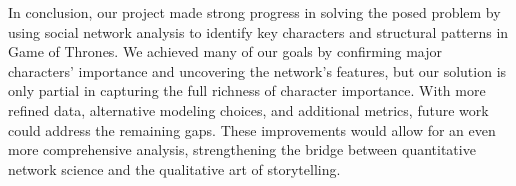 \documentclass[12pt, a4paper]{article}
\begin{document}
In conclusion, our project made strong progress in solving the posed problem by using social network analysis to identify key characters and structural patterns in Game of Thrones. We achieved many of our goals by confirming major characters’ importance and uncovering the network’s features, but our solution is only partial in capturing the full richness of character importance. With more refined data, alternative modeling choices, and additional metrics, future work could address the remaining gaps. These improvements would allow for an even more comprehensive analysis, strengthening the bridge between quantitative network science and the qualitative art of storytelling.
\end{document}
